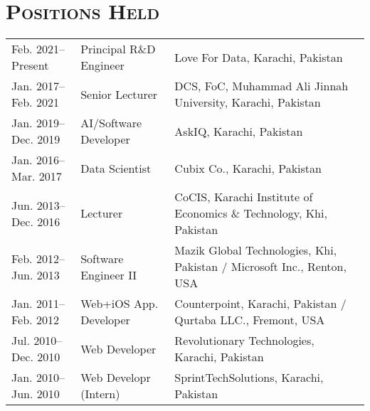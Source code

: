 \documentclass[a4paper, 10pt]{article}
\begin{document}
\section*{\normalfont\textsc{Positions Held}}
{
\tabcolsep=4pt
\begin{tabular}{lll}
Feb. 2021--Present & Principal R\&D Engineer & Love For Data, Karachi, Pakistan \\
Jan. 2017--Feb. 2021 & Senior Lecturer & DCS, FoC, Muhammad Ali Jinnah University, Karachi,   Pakistan \\
Jan. 2019--Dec. 2019 & AI/Software Developer & AskIQ, Karachi, Pakistan \\
Jan. 2016--Mar. 2017 & Data Scientist & Cubix Co., Karachi, Pakistan \\
Jun. 2013--Dec. 2016 & Lecturer & CoCIS, Karachi Institute of Economics \& Technology, Khi, Pakistan \\
Feb. 2012--Jun. 2013 & Software Engineer II & Mazik Global Technologies, Khi, Pakistan / Microsoft Inc., Renton, USA \\
Jan. 2011--Feb. 2012 & Web+iOS App. Developer & Counterpoint, Karachi, Pakistan / Qurtaba LLC., Fremont, USA \\
Jul. 2010--Dec. 2010 & Web Developer & Revolutionary Technologies, Karachi, Pakistan\\
Jan. 2010--Jun. 2010 & Web Developr (Intern) & SprintTechSolutions, Karachi, Pakistan
\end{tabular}
}



\end{document}
